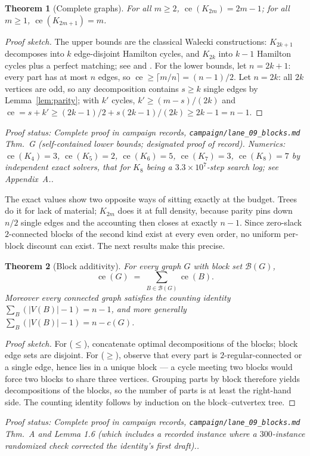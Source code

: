 \documentclass[a4paper,11pt]{amsart}
\newtheorem{theorem}{Theorem}[section]
\theoremstyle{definition}
\theoremstyle{remark}
\newcommand{\ce}{\operatorname{ce}}
\newcommand{\proofsrc}[1]{\par\smallskip\noindent\begin{sloppypar}\small\emph{Proof status: #1.}\end{sloppypar}\par\smallskip}
\begin{document}
\begin{theorem}[Complete graphs]\label{thm:complete}
For all $m\ge2$, $\ce(K_{2m})=2m-1$; for all $m\ge1$, $\ce(K_{2m+1})=m$.
\end{theorem}
\begin{proof}[Proof sketch]
The upper bounds are the classical Walecki constructions: $K_{2k+1}$ decomposes into $k$ edge-disjoint
Hamilton cycles, and $K_{2k}$ into $k-1$ Hamilton cycles plus a perfect matching; see \cite{Lucas1883} and
\cite{BM08}. For the lower bounds, let $n=2k+1$: every part has at most $n$ edges, so
$\ce\ge\lceil m/n\rceil=(n-1)/2$. Let $n=2k$: all $2k$ vertices are odd, so any decomposition contains
$s\ge k$ single edges by Lemma~\ref{lem:parity}; with $k'$ cycles,
$k'\ge(m-s)/(2k)$ and $\ce=s+k'\ge(2k-1)/2+s(2k-1)/(2k)\ge 2k-1=n-1$.
\end{proof}
\proofsrc{Complete proof in campaign records, \texttt{campaign/lane\_09\_blocks.md} Thm.~G (self-contained
lower bounds; designated proof of record). Numerics: $\ce(K_4)=3$, $\ce(K_5)=2$, $\ce(K_6)=5$,
$\ce(K_7)=3$, $\ce(K_8)=7$ by independent exact solvers, that for $K_8$ being a $3.3\times10^7$-step search
log; see Appendix~A.}

The exact values show two opposite ways of sitting exactly at the budget. Trees do it for lack of
material; $K_{2m}$ does it at full density, because parity pins down $n/2$ single edges and the accounting
then closes at exactly $n-1$. Since zero-slack $2$-connected blocks of the second kind exist at every even
order, no uniform per-block discount can exist. The next results make this precise.

\begin{theorem}[Block additivity]\label{thm:blockadd}
For every graph $G$ with block set $\mathcal{B}(G)$,
\[
\ce(G)\;=\;\sum_{B\in\mathcal{B}(G)}\ce(B).
\]
Moreover every connected graph satisfies the counting identity $\sum_{B}(|V(B)|-1)=n-1$, and more generally
$\sum_B(|V(B)|-1)=n-c(G)$.
\end{theorem}
\begin{proof}[Proof sketch]
For ($\le$), concatenate optimal decompositions of the blocks; block edge sets are disjoint. For ($\ge$),
observe that every part is $2$-regular-connected or a single edge, hence lies in a unique block --- a cycle
meeting two blocks would force two blocks to share three vertices. Grouping parts by block therefore
yields decompositions of the blocks, so the number of parts is at least the right-hand side. The counting
identity follows by induction on the block--cutvertex tree.
\end{proof}
\proofsrc{Complete proof in campaign records, \texttt{campaign/lane\_09\_blocks.md} Thm.~A and Lemma 1.6
(which includes a recorded instance where a $300$-instance randomized check corrected the identity's first
draft).}
\end{document}
